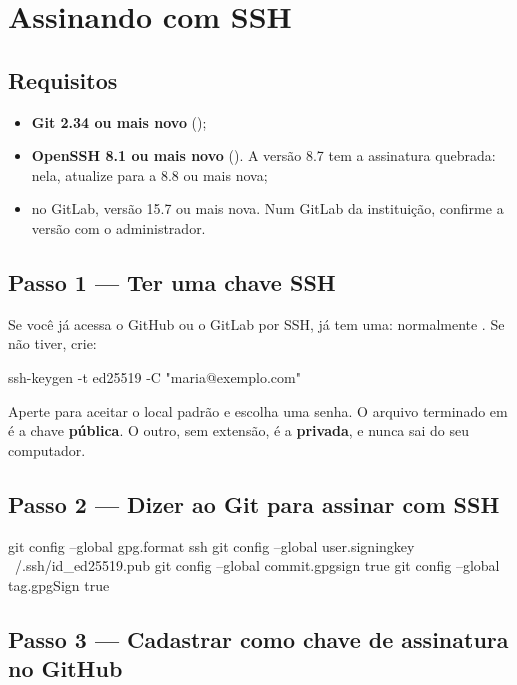 \section{Assinando com SSH}

\subsection{Requisitos}

\begin{itemize}
  \item \textbf{Git 2.34 ou mais novo} ();
  \item \textbf{OpenSSH 8.1 ou mais novo} (). A versão 8.7 tem a assinatura quebrada: nela, atualize para a 8.8 ou mais nova;
  \item no GitLab, versão 15.7 ou mais nova. Num GitLab da instituição, confirme a versão com o administrador.
\end{itemize}

\subsection{Passo 1 — Ter uma chave SSH}

Se você já acessa o GitHub ou o GitLab por SSH, já tem uma: normalmente . Se não tiver, crie:

\begin{terminal}
ssh-keygen -t ed25519 -C "maria@exemplo.com"
\end{terminal}

Aperte  para aceitar o local padrão e escolha uma senha. O arquivo terminado em  é a chave \textbf{pública}. O outro, sem extensão, é a \textbf{privada}, e nunca sai do seu computador.

\subsection{Passo 2 — Dizer ao Git para assinar com SSH}

\begin{terminal}
git config --global gpg.format ssh
git config --global user.signingkey ~/.ssh/id_ed25519.pub
git config --global commit.gpgsign true
git config --global tag.gpgSign true
\end{terminal}

\subsection{Passo 3 — Cadastrar como chave de assinatura no GitHub}

